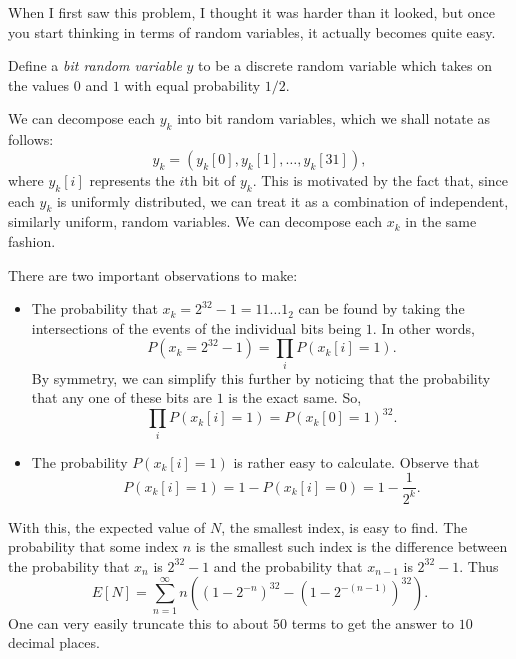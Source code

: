 \documentclass[a5paper, 10pt]{article}
\begin{document}
\begin{solution}
    When I first saw this problem, I thought it was harder than it looked, but once you start thinking in terms of random variables, it actually becomes quite easy.
    \begin{definition}
        Define a \textit{bit random variable} \( y \) to be a discrete random variable which takes on the values \( 0 \) and \( 1 \) with equal probability \( 1/2 \).
    \end{definition}
    We can decompose each \( y_k \) into bit random variables, which we shall notate as follows:
    \[
        y_k = (y_k[0], y_k[1], \ldots, y_k[31])
    ,\]
    where \( y_k[i] \) represents the \( i \)th bit of \( y_k \). This is motivated by the fact that, since each \( y_k \) is uniformly distributed, we can treat it as a combination of independent, similarly uniform, random variables. We can decompose each \( x_k \) in the same fashion.

    There are two important observations to make:
    \vspace{-0.3cm}
    \begin{itemize}[topsep=0pt]
        \item The probability that \( x_k = 2^{32} - 1 = 11\ldots1_2 \) can be found by taking the intersections of the events of the individual bits being \( 1 \). In other words,
            \[
                P(x_k = 2^{32} - 1) = \prod_{i} P(x_k[i] = 1)
            .\]
            By symmetry, we can simplify this further by noticing that the probability that any one of these bits are \( 1 \) is the exact same. So,
            \[
                \prod_{i} P(x_k[i] = 1) = P(x_k[0] = 1)^{32}
            .\]

        \item The probability \( P(x_k[i] = 1) \) is rather easy to calculate. Observe that
            \[
                P(x_k[i] = 1) = 1 - P(x_k[i] = 0) = 1 - \frac{1}{2^k}
            .\]
    \end{itemize}
    With this, the expected value of \( N \), the smallest index, is easy to find. The probability that some index \( n \) is the smallest such index is the difference between the probability that \( x_n \) is \( 2^{32} - 1 \) and the probability that \( x_{n-1} \) is \( 2^{32} - 1 \). Thus
    \[
        E[N] = \sum_{n = 1}^{\infty} n \left( (1 - 2^{-n})^{32} - (1 - 2^{-(n-1)})^{32} \right)
    .\]
    One can very easily truncate this to about \( 50 \) terms to get the answer to \( 10 \) decimal places.
\end{solution}
\end{document}
